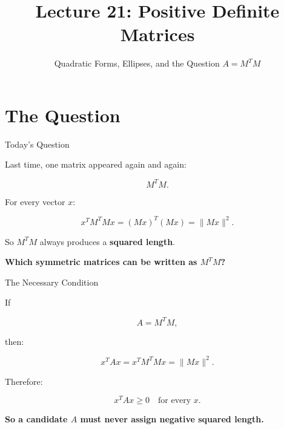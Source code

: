 \documentclass[10pt]{beamer}
\title{Lecture 21: Positive Definite Matrices}
\subtitle{Quadratic Forms, Ellipses, and the Question $A=M^TM$}
\date{}
\theoremstyle{definition}
\newcommand{\x}[1]{\alert{\textbf{#1}}}
\begin{document}
\begin{frame}[plain,shrink=10]
\titlepage
\end{frame}

\section{The Question}

\begin{frame}{Today's Question}

Last time, one matrix appeared again and again:

$$
M^TM.
$$

\vfill

For every vector $x$:

$$
x^TM^TMx=(Mx)^T(Mx)=\|Mx\|^2.
$$

\vfill

So $M^TM$ always produces a \x{squared length}.

\vfill

\begin{center}
{\Large \x{Which symmetric matrices can be written as $M^TM$?}}
\end{center}

\end{frame}


\begin{frame}{The Necessary Condition}

If

$$
A=M^TM,
$$

then:

$$
x^TAx=x^TM^TMx=\|Mx\|^2.
$$

\vfill

Therefore:

$$
\boxed{x^TAx\ge0\quad\text{for every }x.}
$$

\vfill

\begin{center}
\x{So a candidate $A$ must never assign negative squared length.}
\end{center}

\end{frame}
\end{document}
